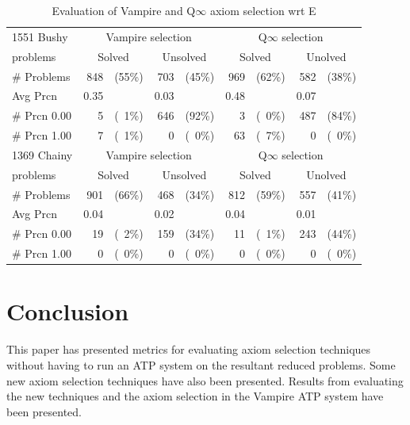 \documentclass[EPiC]{easychair}
\begin{document}
\begin{table}[hbt]
\begin{center}
\begin{tabular}{|l|rr|rr|rr|rr|}
\hline
1551 Bushy      & \multicolumn{4}{|c|}{Vampire selection} & \multicolumn{4}{|c|}{Q$\infty$ selection} \\
problems        & \multicolumn{2}{|c|}{Solved} & \multicolumn{2}{|c|}{Unsolved} & \multicolumn{2}{|c|}{Solved} & \multicolumn{2}{|c|}{Unolved} \\
\hline
\# Problems     &  848 & (55\%) &  703 & (45\%) &  969 & (62\%) &  582 & (38\%) \\
Avg Prcn        & 0.35 &        & 0.03 &        & 0.48 &        & 0.07 &        \\
\# Prcn 0.00    &    5 & (~1\%) &  646 & (92\%) &    3 & (~0\%) &  487 & (84\%) \\
\# Prcn 1.00    &    7 & (~1\%) &    0 & (~0\%) &   63 & (~7\%) &    0 & (~0\%) \\
\hline
\hline
1369 Chainy     & \multicolumn{4}{|c|}{Vampire selection} & \multicolumn{4}{|c|}{Q$\infty$ selection} \\
problems        & \multicolumn{2}{|c|}{Solved} & \multicolumn{2}{|c|}{Unsolved} & \multicolumn{2}{|c|}{Solved} & \multicolumn{2}{|c|}{Unolved} \\
\hline
\# Problems     &  901 & (66\%) &  468 & (34\%) &  812 & (59\%) &  557 & (41\%) \\
Avg Prcn        & 0.04 &        & 0.02 &        & 0.04 &        & 0.01 &        \\
\# Prcn 0.00    &   19 & (~2\%) &  159 & (34\%) &   11 & (~1\%) &  243 & (44\%) \\
\# Prcn 1.00    &    0 & (~0\%) &    0 & (~0\%) &    0 & (~0\%) &    0 & (~0\%) \\
\hline
\end{tabular}
\caption{Evaluation of Vampire and Q$\infty$ axiom selection wrt E}
\label{EvaluationOfMetrics}
\end{center}
\end{table}

\section{Conclusion}
\label{Conclusion}

This paper has presented metrics for evaluating axiom selection techniques
without having to run an ATP system on the resultant reduced problems.
Some new axiom selection techniques have also been presented.
Results from evaluating the new techniques and the axiom selection in the 
Vampire ATP system have been presented.
\end{document}
